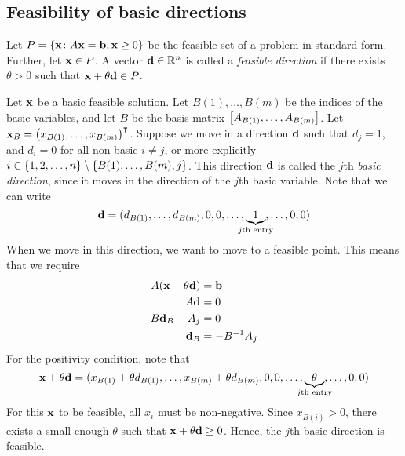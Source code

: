 \subsection{Feasibility of basic directions}
\begin{definition}
	Let \( P = \qty{\vb x \colon A \vb x = \vb b, \vb x \geq 0} \) be the feasible set of a problem in standard form.
	Further, let \( \vb x \in P \).
	A vector \( \vb d \in \mathbb R^n \) is called a \textit{feasible direction} if there exists \( \theta > 0 \) such that \( \vb x + \theta \vb d \in P \).
\end{definition}
Let \( \vb x \) be a basic feasible solution.
Let \( B(1), \dots, B(m) \) be the indices of the basic variables, and let \( B \) be the basis matrix \( \qty[A_{B(1)}, \dots, A_{B(m)}] \).
Let \( \vb x_B = \qty(x_{B(1)}, \dots, x_{B(m)})^\intercal \).
Suppose we move in a direction \( \vb d \) such that \( d_j = 1 \), and \( d_i = 0 \) for all non-basic \( i \neq j \), or more explicitly \( i \in \qty{1,2,\dots,n}\setminus\qty{B(1),\dots,B(m),j} \).
This direction \( \vb d \) is called the \( j \)th \textit{basic direction}, since it moves in the direction of the \( j \)th basic variable.
Note that we can write
\[
	\vb d = (d_{B(1)}, \dots, d_{B(m)}, 0, 0, \dots, \underbrace{1}_{\mathclap{j\text{th entry}}}, \dots, 0, 0)
\]
When we move in this direction, we want to move to a feasible point.
This means that we require
\begin{align*}
	A(\vb x + \theta \vb d) & = \vb b      \\
	A\vb d                  & = 0          \\
	B\vb d_B + A_j          & = 0          \\
	\vb d_B                 & = -B^{-1}A_j
\end{align*}
For the positivity condition, note that
\[
	\vb x + \theta \vb d = (x_{B(1)}+\theta d_{B(1)}, \dots, x_{B(m)}+\theta d_{B(m)}, 0, 0, \dots, \underbrace{\theta}_{\mathclap{j\text{th entry}}}, \dots, 0, 0)
\]
For this \( \vb x \) to be feasible, all \( x_i \) must be non-negative.
Since \( x_{B(i)} > 0 \), there exists a small enough \( \theta \) such that \( \vb x + \theta \vb d \geq 0 \).
Hence, the \( j \)th basic direction is feasible.

